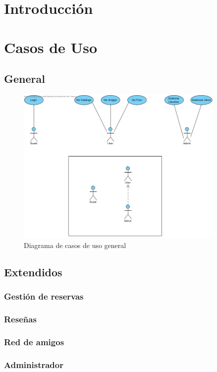 \documentclass{report}
\begin{document}
    \chapter{Introducción}
    \chapter{Casos de Uso}
        \section{General}
            \begin{figure}[H]
                \centering
                \includegraphics[width=0.9\textwidth]{img/casos_uso/general.png}
                \caption{Diagrama de casos de uso general}
            \end{figure}
        \clearpage
        \section{Extendidos}
        \subsection{Gestión de reservas}
        \clearpage
        \subsection{Reseñas}
        \clearpage
        \subsection{Red de amigos}
        \clearpage
        \subsection{Administrador}
        \clearpage
\end{document}
